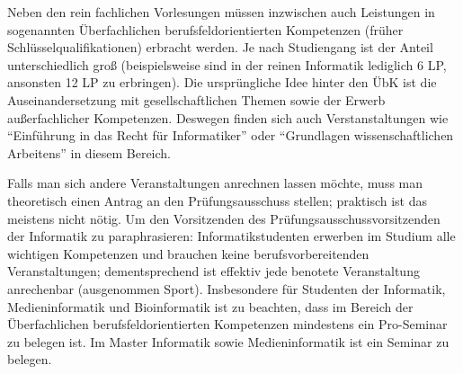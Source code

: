 Neben den rein fachlichen Vorlesungen m\"ussen inzwischen auch Leistungen in sogenannten \"Uberfachlichen berufsfeldorientierten Kompetenzen (fr\"uher Schl\"usselqualifikationen) erbracht 
werden. Je nach Studiengang ist der Anteil unterschiedlich gro\ss 
 (beispielsweise sind in der reinen Informatik lediglich 6 LP, ansonsten 12 LP zu erbringen). Die urspr\"ungliche Idee hinter den 
\"UbK ist die Auseinandersetzung mit gesellschaftlichen 
Themen sowie der Erwerb au\ss{}erfachlicher Kompetenzen. Deswegen finden sich 
auch Verstanstaltungen wie  "`Einf\"uhrung in das Recht f\"ur Informatiker"' 
oder "`Grundlagen wissenschaftlichen Arbeitens"' in diesem Bereich.

Falls man sich andere Veranstaltungen anrechnen lassen m\"ochte, muss man 
theoretisch einen Antrag an den Pr\"ufungsausschuss stellen; praktisch ist 
das meistens nicht n\"otig. Um den Vorsitzenden des 
Pr\"ufungsausschussvorsitzenden der Informatik zu paraphrasieren: 
Informatikstudenten erwerben im Studium alle wichtigen Kompetenzen und brauchen 
keine berufsvorbereitenden Veranstaltungen; dementsprechend ist effektiv jede 
benotete Veranstaltung anrechenbar (ausgenommen Sport). Insbesondere f\"ur 
Studenten der Informatik, Medieninformatik und Bioinformatik ist zu beachten, dass im Bereich der 
\"Uberfachlichen berufsfeldorientierten Kompetenzen mindestens ein Pro-Seminar zu belegen ist. Im Master 
Informatik sowie Medieninformatik ist ein Seminar zu belegen.

